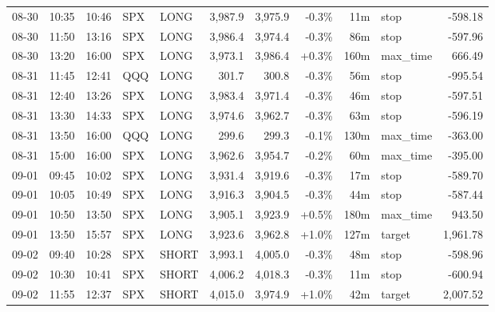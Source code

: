 \documentclass[11pt,a4paper,twoside]{article}
\begin{document}
\begin{center}
\begin{longtable}{>{\color{txtmain}}l l l l l r r r r >{\color{txtmain}}l r}
08-30 & 10:35 & 10:46 & SPX & LONG & 3,987.9 & 3,975.9 & \textcolor{lossred}{-0.3\%} & 11m & stop & \textcolor{lossred}{-598.18} \\
08-30 & 11:50 & 13:16 & SPX & LONG & 3,986.4 & 3,974.4 & \textcolor{lossred}{-0.3\%} & 86m & stop & \textcolor{lossred}{-597.96} \\
08-30 & 13:20 & 16:00 & SPX & LONG & 3,973.1 & 3,986.4 & \textcolor{wingreen}{+0.3\%} & 160m & max\_time & \textcolor{wingreen}{666.49} \\
08-31 & 11:45 & 12:41 & QQQ & LONG & 301.7 & 300.8 & \textcolor{lossred}{-0.3\%} & 56m & stop & \textcolor{lossred}{-995.54} \\
08-31 & 12:40 & 13:26 & SPX & LONG & 3,983.4 & 3,971.4 & \textcolor{lossred}{-0.3\%} & 46m & stop & \textcolor{lossred}{-597.51} \\
08-31 & 13:30 & 14:33 & SPX & LONG & 3,974.6 & 3,962.7 & \textcolor{lossred}{-0.3\%} & 63m & stop & \textcolor{lossred}{-596.19} \\
08-31 & 13:50 & 16:00 & QQQ & LONG & 299.6 & 299.3 & \textcolor{lossred}{-0.1\%} & 130m & max\_time & \textcolor{lossred}{-363.00} \\
08-31 & 15:00 & 16:00 & SPX & LONG & 3,962.6 & 3,954.7 & \textcolor{lossred}{-0.2\%} & 60m & max\_time & \textcolor{lossred}{-395.00} \\
09-01 & 09:45 & 10:02 & SPX & LONG & 3,931.4 & 3,919.6 & \textcolor{lossred}{-0.3\%} & 17m & stop & \textcolor{lossred}{-589.70} \\
09-01 & 10:05 & 10:49 & SPX & LONG & 3,916.3 & 3,904.5 & \textcolor{lossred}{-0.3\%} & 44m & stop & \textcolor{lossred}{-587.44} \\
09-01 & 10:50 & 13:50 & SPX & LONG & 3,905.1 & 3,923.9 & \textcolor{wingreen}{+0.5\%} & 180m & max\_time & \textcolor{wingreen}{943.50} \\
09-01 & 13:50 & 15:57 & SPX & LONG & 3,923.6 & 3,962.8 & \textcolor{wingreen}{+1.0\%} & 127m & target & \textcolor{wingreen}{1,961.78} \\
09-02 & 09:40 & 10:28 & SPX & SHORT & 3,993.1 & 4,005.0 & \textcolor{lossred}{-0.3\%} & 48m & stop & \textcolor{lossred}{-598.96} \\
09-02 & 10:30 & 10:41 & SPX & SHORT & 4,006.2 & 4,018.3 & \textcolor{lossred}{-0.3\%} & 11m & stop & \textcolor{lossred}{-600.94} \\
09-02 & 11:55 & 12:37 & SPX & SHORT & 4,015.0 & 3,974.9 & \textcolor{wingreen}{+1.0\%} & 42m & target & \textcolor{wingreen}{2,007.52} \\

\end{longtable}
\end{center}
\end{document}
